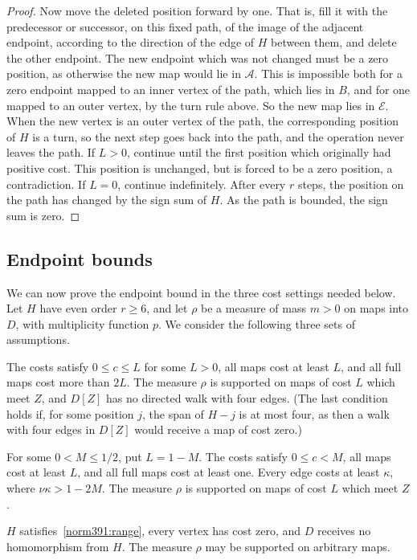 \begin{proof}
Now move the deleted position forward by one. That is, fill it with the predecessor or successor, on this fixed path, of the image of the adjacent endpoint, according to the direction of the edge of $H$ between them, and delete the other endpoint. The new endpoint which was not changed must be a zero position, as otherwise the new map would lie in $\mathcal A$. This is impossible both for a zero endpoint mapped to an inner vertex of the path, which lies in $B$, and for one mapped to an outer vertex, by the turn rule above. So the new map lies in $\mathcal E$. When the new vertex is an outer vertex of the path, the corresponding position of $H$ is a turn, so the next step goes back into the path, and the operation never leaves the path.
If $L>0$, continue until the first position which originally had positive cost. This position is unchanged, but is forced to be a zero position, a contradiction.
If $L=0$, continue indefinitely. After every $r$ steps, the position on the path has changed by the sign sum of $H$. As the path is bounded, the sign sum is zero.
\end{proof}

\subsection{Endpoint bounds}
We can now prove the endpoint bound in the three cost settings needed below.
Let $H$ have even order $r\ge6$, and let $\rho$ be a measure of mass $m>0$ on maps into $D$, with multiplicity function $p$.
We consider the following three sets of assumptions.
\begin{props}
\item\label{norm391:positive-endpoint:1} The costs satisfy $0\le c\le L$ for some $L>0$, all maps cost
at least $L$, and all full maps cost more than $2L$. The measure $\rho$ is supported
on maps of cost $L$ which meet $Z$, and $D[Z]$ has no directed walk with four edges. (The last condition holds if, for some position $j$, the span of $H-j$ is at most four, as then a walk with four edges in $D[Z]$ would receive a map of cost zero.)

\item\label{norm391:positive-endpoint:2} For some $0<M\le1/2$, put $L=1-M$. The costs satisfy $0\le c<M$,
all maps cost at least $L$, and all full maps cost at least one.
Every edge costs at least $\kappa$, where $\nu\kappa>1-2M$.
The measure $\rho$ is supported on maps of cost $L$ which meet $Z$.

\item\label{norm391:positive-endpoint:3} $H$ satisfies~\eqref{norm391:range}, every vertex has cost
zero, and $D$ receives no homomorphism from $H$. The measure $\rho$
may be supported on arbitrary maps.
\end{props}

